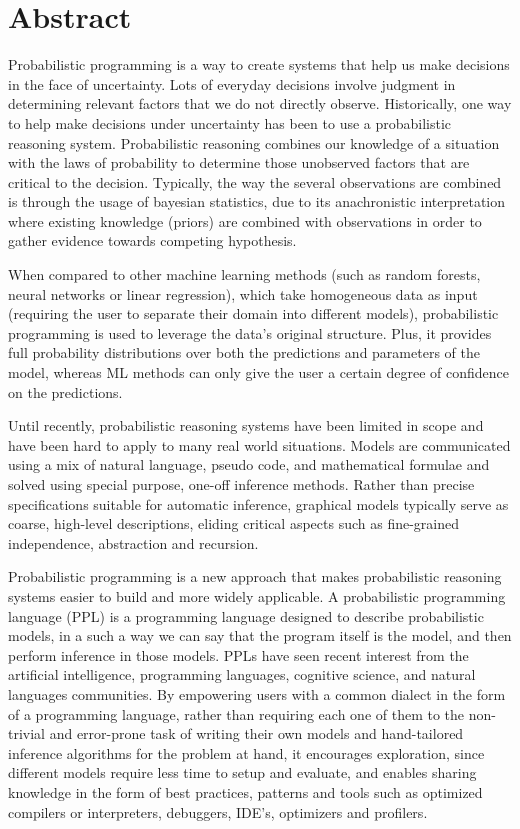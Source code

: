 \chapter*{Abstract}

Probabilistic programming is a way to create systems that help us make decisions
 in the face of uncertainty. Lots of everyday decisions involve judgment in
determining relevant factors that we do not directly observe. Historically, one
way to help make decisions under uncertainty has been to use a probabilistic
reasoning system.
Probabilistic reasoning combines our knowledge of a situation with the laws of
probability to determine those unobserved factors that are critical to the
decision. Typically, the way the several observations are combined is through
the usage of bayesian statistics, due to its anachronistic interpretation where
existing knowledge (priors) are combined with observations in order to gather
evidence towards competing hypothesis.

When compared to other machine learning methods (such as random forests, neural
networks or linear regression), which take homogeneous data as input (requiring
the user to separate their domain into different models), probabilistic
 programming is used to leverage the data’s original structure. Plus, it
 provides full probability distributions over both the predictions and
 parameters of the model, whereas ML methods can only give the user a certain
 degree of confidence on the predictions.

Until recently, probabilistic reasoning systems have been limited in scope and
have been hard to apply to many real world situations. Models are communicated
using a mix of natural language, pseudo code, and mathematical formulae and
solved using special purpose, one-off inference methods. Rather than precise
specifications suitable for automatic inference, graphical models typically
serve as coarse, high-level descriptions, eliding critical aspects such as
fine-grained independence, abstraction and recursion.

Probabilistic programming is a new approach that makes probabilistic reasoning
systems easier to build and more widely applicable. A probabilistic programming
language (PPL) is a programming language designed to describe probabilistic
models, in a such a way we can say that the program itself is the model, and
then perform inference in those models. PPLs have seen recent interest from the
artificial intelligence, programming languages, cognitive science, and natural
languages communities. By empowering users with a common dialect in the form of
a programming language, rather than requiring each one of them to the non-trivial
and error-prone task of writing their own models and hand-tailored inference
algorithms for the problem at hand, it encourages exploration, since different
models require less time to setup and evaluate, and enables sharing knowledge
in the form of best practices, patterns and tools such as optimized compilers
or interpreters, debuggers, IDE’s, optimizers and profilers.

